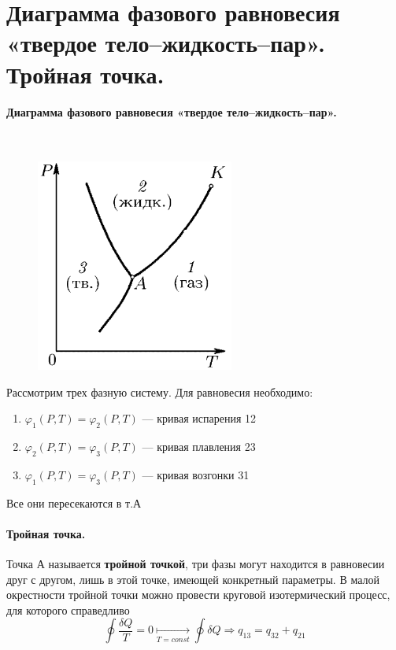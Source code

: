 \section{\normalsize Диаграмма фазового равновесия «твердое тело--жидкость--пар». Тройная точка.}
\paragraph{Диаграмма фазового равновесия «твердое тело--жидкость--пар».}$\;$\\
\begin{minipage}{75mm}
	\begin{figure}[H]
		\includegraphics[width=65mm]{ris17.png}
	\end{figure}
\end{minipage}
\begin{minipage}{100mm}
	Рассмотрим трех фазную систему. Для равновесия необходимо:
	\begin{enumerate}[(1)]
		\item $\varphi_1(P,T)=\varphi_2(P,T)$ --- кривая испарения 12
		\item $\varphi_2(P,T)=\varphi_3(P,T)$ --- кривая плавления 23
		\item $\varphi_1(P,T)=\varphi_3(P,T)$ --- кривая возгонки 31
	\end{enumerate}
	Все они пересекаются в т.А
\end{minipage}
\paragraph{Тройная точка.}
Точка А называется \textbf{тройной точкой}, три фазы могут находится в равновесии друг с другом, лишь в этой точке, имеющей конкретный параметры. В малой окрестности тройной точки можно провести круговой изотермический процесс, для которого справедливо
$$\oint\dfrac{\delta Q}{T}=0\underset{T=const}{\longmapsto}\oint\delta Q \Rightarrow q_\text{13}=q_\text{32}+q_\text{21}$$
